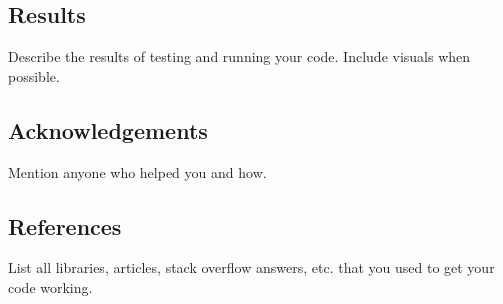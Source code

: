 \subsection*{Results }

Describe the results of testing and running your code. Include visuals when possible.

\subsection*{Acknowledgements }

Mention anyone who helped you and how.

\subsection*{References }

List all libraries, articles, stack overflow answers, etc. that you used to get your code working. 